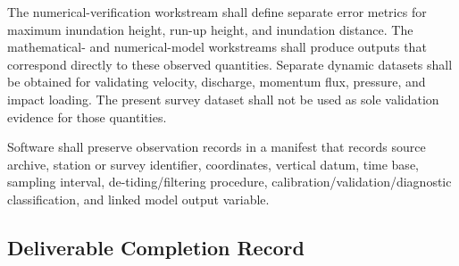 
The numerical-verification workstream shall define separate error metrics for maximum inundation height, run-up height, and inundation distance. The mathematical- and numerical-model workstreams shall produce outputs that correspond directly to these observed quantities. Separate dynamic datasets shall be obtained for validating velocity, discharge, momentum flux, pressure, and impact loading. The present survey dataset shall not be used as sole validation evidence for those quantities.

Software shall preserve observation records in a manifest that records
source archive, station or survey identifier, coordinates, vertical
datum, time base, sampling interval, de-tiding/filtering procedure,
calibration/validation/diagnostic classification, and linked model
output variable.

\subsection{Deliverable Completion Record}
\label{sec:res-dat-obs-completion-record}

%
%
%
